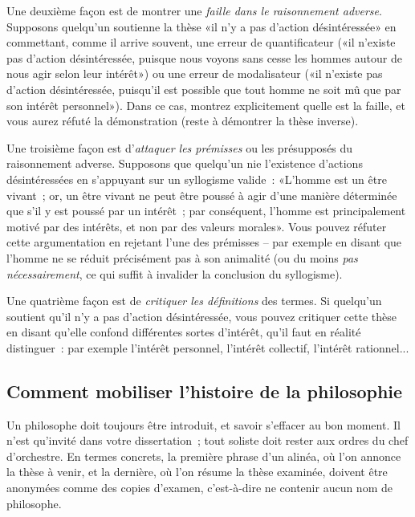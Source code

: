 \documentclass[a4paper,11pt]{article}
\newcommand{\cad}{c'est-à-dire}
\begin{document}
\par

Une deuxième façon est de montrer une \emph{faille dans le raisonnement
  adverse}. Supposons quelqu'un soutienne la thèse «il n'y a pas
d'action désintéressée» en commettant, comme il arrive souvent, une
erreur de quantificateur («il n'existe pas d'action désintéressée,
puisque nous voyons sans cesse les hommes autour de nous agir selon leur
intérêt») ou une erreur de modalisateur («il n'existe pas d'action
désintéressée, puisqu'il est possible que tout homme ne soit mû que par
son intérêt personnel»). Dans ce cas, montrez explicitement quelle est
la faille, et vous aurez réfuté la démonstration (reste à démontrer la
thèse inverse).

\par

Une troisième façon est d'\emph{attaquer les prémisses} ou les
présupposés du raisonnement adverse. Supposons que quelqu'un nie
l'existence d'actions désintéressées en s'appuyant sur un syllogisme
valide~: «L'homme est un être vivant~; or, un être vivant ne peut être
poussé à agir d'une manière déterminée que s'il y est poussé par un
intérêt~; par conséquent, l'homme est principalement motivé par des
intérêts, et non par des valeurs morales». Vous pouvez réfuter cette
argumentation en rejetant l'une des prémisses -- par exemple en disant
que l'homme ne se réduit précisément pas à son animalité (ou du moins
\emph{pas nécessairement}, ce qui suffit à invalider la conclusion du
syllogisme).

\par

Une quatrième façon est de \emph{critiquer les définitions} des termes.
Si quelqu'un soutient qu'il n'y a pas d'action désintéressée, vous
pouvez critiquer cette thèse en disant qu'elle confond différentes
sortes d'intérêt, qu'il faut en réalité distinguer~: par exemple
l'intérêt personnel, l'intérêt collectif, l'intérêt rationnel...




\subsection{Comment mobiliser l'histoire de la philosophie}

Un philosophe doit toujours être introduit, et savoir s'effacer au bon
moment. Il n'est qu'invité dans votre dissertation~; tout soliste doit
rester aux ordres du chef d'orchestre. En termes concrets, la première
phrase d'un alinéa, où l'on annonce la thèse à venir, et la dernière, où
l'on résume la thèse examinée, doivent être anonymées comme des copies
d'examen, \cad{} ne contenir aucun nom de philosophe. 
\end{document}
